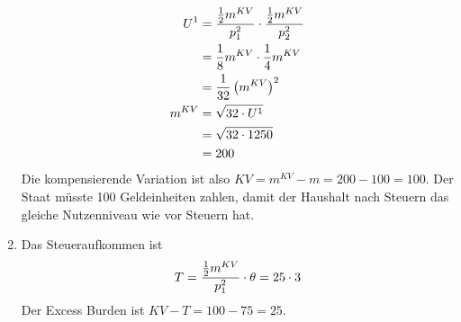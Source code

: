 \documentclass{article}
\begin{document}
\begin{enumerate}[label=(\alph*)]
		\begin{align}
			U^1 &= \frac{\frac{1}{2}m^{KV}}{p_1^2} \cdot\frac{\frac{1}{2}m^{KV}}{p_2^2} \notag \\
			&= \frac{1}{8}m^{KV}\cdot \frac{1}{4}m^{KV} \notag \\
			&= \frac{1}{32}\left(m^{KV}\right)^2 \notag \\
			m^{KV} &= \sqrt{32\cdot U^1} \notag \\
			&= \sqrt{32\cdot 1250} \notag \\
			&= 200 \notag
		\end{align}
		Die kompensierende Variation ist also $KV=m^{KV}-m=200-100=100$. Der Staat müsste 100 Geldeinheiten zahlen, damit der Haushalt nach Steuern das gleiche Nutzenniveau wie vor Steuern hat.
		\item Das Steueraufkommen ist
		\begin{align}
			T = \frac{\frac{1}{2}m^{KV}}{p_1^2} \cdot \theta = 25\cdot 3 \notag
		\end{align}
		Der Excess Burden ist $KV-T=100-75=25$.
	\end{enumerate}
	
\end{document}
